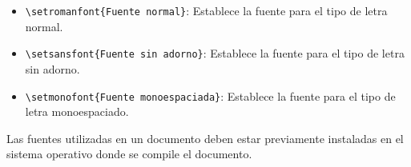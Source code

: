 \documentclass[
  spanish,
  a4paper,
]{scrreport}
\providecommand{\tightlist}{%
  \setlength{\itemsep}{0pt}\setlength{\parskip}{0pt}}
\theoremstyle{definition}
\theoremstyle{remark}
\begin{document}
\begin{itemize}
\tightlist
\item
  \texttt{\textbackslash{}setromanfont\{Fuente\ normal\}}: Establece la
  fuente para el tipo de letra normal.
\item
  \texttt{\textbackslash{}setsansfont\{Fuente\ sin\ adorno\}}: Establece
  la fuente para el tipo de letra sin adorno.
\item
  \texttt{\textbackslash{}setmonofont\{Fuente\ monoespaciada\}}:
  Establece la fuente para el tipo de letra monoespaciado.
\end{itemize}

\begin{tcolorbox}[enhanced jigsaw, arc=.35mm, bottomrule=.15mm, bottomtitle=1mm, breakable, colback=white, colbacktitle=quarto-callout-caution-color!10!white, colframe=quarto-callout-caution-color-frame, coltitle=black, left=2mm, leftrule=.75mm, opacityback=0, opacitybacktitle=0.6, rightrule=.15mm, title=\textcolor{quarto-callout-caution-color}{\faFire}\hspace{0.5em}{Precaución}, titlerule=0mm, toprule=.15mm, toptitle=1mm]

Las fuentes utilizadas en un documento deben estar previamente
instaladas en el sistema operativo donde se compile el documento.

\end{tcolorbox}
\end{document}
